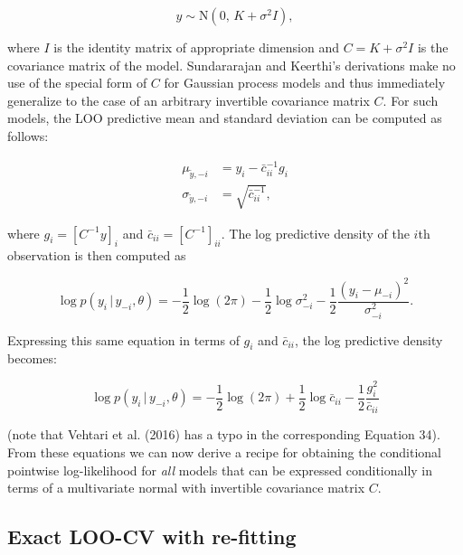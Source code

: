 \documentclass[english,,doc,floatsintext]{apa6}
\theoremstyle{definition}
\theoremstyle{definition}
\theoremstyle{definition}
\theoremstyle{remark}
\begin{document}
\begin{equation}
y \sim {\mathrm N}(0, \, K+\sigma^2 I),
\end{equation}

where \(I\) is the identity matrix of appropriate dimension and
\(C = K+\sigma^2 I\) is the covariance matrix of the model. Sundararajan
and Keerthi's derivations make no use of the special form of \(C\) for
Gaussian process models and thus immediately generalize to the case of
an arbitrary invertible covariance matrix \(C\). For such models, the
LOO predictive mean and standard deviation can be computed as follows:

\begin{align}
\label{ypredpars}
  \mu_{\tilde{y},-i} &= y_i-\bar{c}_{ii}^{-1} g_i \nonumber \\
  \sigma_{\tilde{y},-i} &= \sqrt{\bar{c}_{ii}^{-1}},
\end{align}

where \(g_i = \left[C^{-1} y\right]_i\) and
\(\bar{c}_{ii} = \left[C^{-1}\right]_{ii}\). The log predictive density
of the \(i\)th observation is then computed as

\begin{equation}
  \log p(y_i \,|\, y_{-i},\theta)
  = - \frac{1}{2}\log(2\pi)
  - \frac{1}{2}\log \sigma^2_{-i}
  - \frac{1}{2}\frac{(y_i-\mu_{-i})^2}{\sigma^2_{-i}}.
\end{equation}

Expressing this same equation in terms of \(g_i\) and \(\bar{c}_{ii}\),
the log predictive density becomes:

\begin{equation}
  \log p(y_i \,|\, y_{-i},\theta)
  = - \frac{1}{2}\log(2\pi)
  + \frac{1}{2}\log \bar{c}_{ii}
  - \frac{1}{2}\frac{g_i^2}{\bar{c}_{ii}}
\end{equation}

(note that Vehtari et al. (2016) has a typo in the corresponding
Equation 34). From these equations we can now derive a recipe for
obtaining the conditional pointwise log-likelihood for \emph{all} models
that can be expressed conditionally in terms of a multivariate normal
with invertible covariance matrix \(C\).

\hypertarget{exact-loo-cv-with-re-fitting}{%
\subsection{Exact LOO-CV with
re-fitting}\label{exact-loo-cv-with-re-fitting}}
\end{document}
